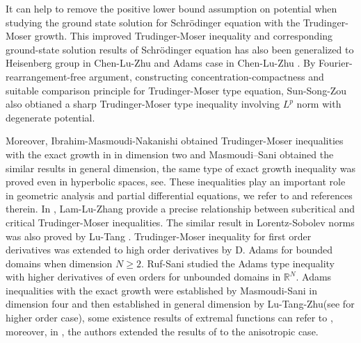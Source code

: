 \documentclass[11pt]{article}
\theoremstyle{plain}
\numberwithin{equation}{section}
\begin{document}
 It can help to remove the positive lower bound assumption on potential when studying the ground state solution for Schr\"{o}dinger equation with the Trudinger-Moser growth.
 This improved Trudinger-Moser inequality and corresponding ground-state solution results of Schr\"{o}dinger equation has also been generalized to Heisenberg group in Chen-Lu-Zhu \cite{Chen-Lu-Zhu-2023'}
 and Adams case in Chen-Lu-Zhu \cite{Chen-Lu-Zhu-2023}. By Fourier-rearrangement-free argument, constructing concentration-compactness and suitable comparison principle for Trudinger-Moser type equation, Sun-Song-Zou\cite{Sun-Song-Zou} also obtianed  a sharp Trudinger-Moser type inequality involving $L^p$
norm  with degenerate potential.


Moreover, Ibrahim-Masmoudi-Nakanishi \cite{Ibrahim-Masmoudi-Nakanishi-2015}  obtained Trudinger-Moser inequalities with the exact growth in in dimension two and
Masmoudi--Sani \cite{Masmoudi-Sani-2015}  obtained the similar results in general dimension, the same type of exact growth inequality was proved even in hyperbolic spaces, see\cite{Lu-Tang-2016}. These  inequalities  play an important role in geometric analysis and partial differential equations, we refer  to \cite{Chang-Yang-2003,de- Figueiredo-Miyagaki-Ruf-1995, Adimurthi-Yang-2010, Lam-Lu-2014, do-O-Souza-de- Medeiros-Severo-2014, Masmoudi-Sani-2015} and references therein. In \cite{Lam-Lu-Zhang-2017},   Lam-Lu-Zhang  provide a precise relationship between  subcritical and
critical  Trudinger-Moser inequalities. The similar result in Lorentz-Sobolev norms was also proved
by Lu-Tang \cite{Lu-Tang-2016'}.
Trudinger-Moser inequality for first order derivatives was extended to high order derivatives by D. Adams \cite{Adams-1988} for
bounded domains when  dimension $N\geq2$. Ruf-Sani \cite{ Ruf-Sani-2013} studied the Adams type inequality with
higher derivatives of even orders for unbounded domains in $\mathbb{R}^{N}$. Adams inequalities with the exact growth were established by  Masmoudi-Sani\cite{Masmoudi-Sani-2014} in dimension four and then established in general dimension by Lu-Tang-Zhu\cite{Lu-Tang-Zhu-2015}(see \cite{Masmoudi-Sani-2018} for higher order case), some existence results of extremal functions can refer to \cite{Chen-Lu-Zhu-2020}, moreover, in
\cite{Zhang-Yang-Cheng-Zhou-2025}, the authors extended the results of \cite{Masmoudi-Sani-2014} to the anisotropic case.
\end{document}
